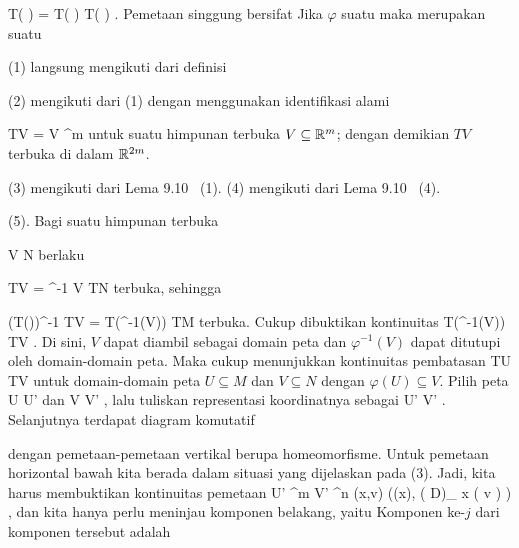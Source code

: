 {{{\mavergleichskettedisp
{\vergleichskette
{ T( \varphi \circ \psi)
}
{ =} { T( \varphi) \circ T( \psi)
}
{ } {
}
{ } {
}
{ } {
}
}
{}{}{.}
}{Pemetaan singgung
bersifat
}{Jika $\varphi$ suatu
maka
merupakan suatu
}}
\faktzusatz {}
\faktzusatz {}

}
{

\teilbeweis {}{}{}
{(1) langsung mengikuti dari definisi
}
{}
\teilbeweis {}{}{}
{(2) mengikuti dari (1) dengan menggunakan identifikasi alami

\mavergleichskette
{\vergleichskette
{ TV
}
{ = }{ V \times \R^m
}
{  }{
}
{    }{
}
{   }{
}
}
{}{}{}
untuk suatu himpunan terbuka $V\subseteq{\mathbb R}^m$; dengan demikian $TV$ terbuka di dalam ${\mathbb R}^{2m}$.}
{}
\teilbeweis {}{}{}
{(3) mengikuti dari
Lema 9.10  (1).}
{}
\teilbeweis {}{}{}
{(4) mengikuti dari
Lema 9.10  (4).}
{}
\teilbeweis {}{}{}
{(5). Bagi suatu himpunan terbuka

\mavergleichskettedisp
{\vergleichskette
{ V
}
{ \subseteq} { N
}
{ } {
}
{ } {
}
{ } {
}
}
{}{}{}
berlaku

\mavergleichskette
{\vergleichskette
{ TV
}
{ = }{ \pi^{-1} V
}
{ \subseteq }{ TN
}
{    }{
}
{   }{
}
}
{}{}{}
terbuka, sehingga

\mavergleichskette
{\vergleichskette
{ (T(\varphi))^{-1} TV
}
{ = }{ T(\varphi^{-1}(V))
}
{ \subseteq }{ TM
}
{    }{
}
{   }{
}
}
{}{}{}
terbuka. Cukup dibuktikan kontinuitas
\maabbdisp {} {T(\varphi^{-1}(V))} {TV
} {}
.
Di sini, $V$ dapat diambil sebagai domain peta dan $\varphi^{-1}(V)$ dapat ditutupi oleh domain-domain peta. Maka cukup menunjukkan kontinuitas pembatasan
 {TU} {TV
} {}
untuk domain-domain peta $U\subseteq M$ dan $V\subseteq N$ dengan $\varphi(U)\subseteq V$. Pilih peta
\maabb {\alpha} {U} {U'
} {}
dan
\maabbdisp {\beta} {V} {V'
} {,}
lalu tuliskan representasi koordinatnya sebagai
 {U'} {V'
} {.}
Selanjutnya terdapat diagram komutatif

 {  }
 dengan pemetaan-pemetaan vertikal berupa homeomorfisme. Untuk pemetaan horizontal bawah kita berada dalam situasi yang dijelaskan pada (3). Jadi, kita harus membuktikan kontinuitas pemetaan
 {U' \times \R^m } { V' \times \R^n
} {(x,v)} {(\widetilde\varphi(x), \left(  D\widetilde\varphi  \right)_{ x } \left(  v  \right) )
} {,}
dan kita hanya perlu meninjau komponen belakang, yaitu
Komponen ke-$j$ dari komponen tersebut adalah

}}

